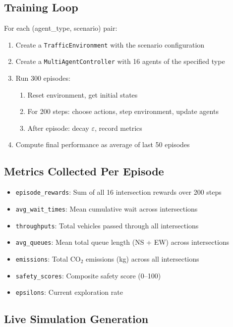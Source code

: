 \documentclass[12pt, a4paper]{article}
\begin{document}
\subsection{Training Loop}

For each (agent\_type, scenario) pair:
\begin{enumerate}[nosep]
    \item Create a \texttt{TrafficEnvironment} with the scenario configuration
    \item Create a \texttt{MultiAgentController} with 16 agents of the specified type
    \item Run 300 episodes:
    \begin{enumerate}[nosep]
        \item Reset environment, get initial states
        \item For 200 steps: choose actions, step environment, update agents
        \item After episode: decay $\varepsilon$, record metrics
    \end{enumerate}
    \item Compute final performance as average of last 50 episodes
\end{enumerate}

\subsection{Metrics Collected Per Episode}

\begin{itemize}[nosep]
    \item \texttt{episode\_rewards}: Sum of all 16 intersection rewards over 200 steps
    \item \texttt{avg\_wait\_times}: Mean cumulative wait across intersections
    \item \texttt{throughputs}: Total vehicles passed through all intersections
    \item \texttt{avg\_queues}: Mean total queue length (NS + EW) across intersections
    \item \texttt{emissions}: Total CO$_2$ emissions (kg) across all intersections
    \item \texttt{safety\_scores}: Composite safety score (0--100)
    \item \texttt{epsilons}: Current exploration rate
\end{itemize}

\subsection{Live Simulation Generation}
\end{document}
